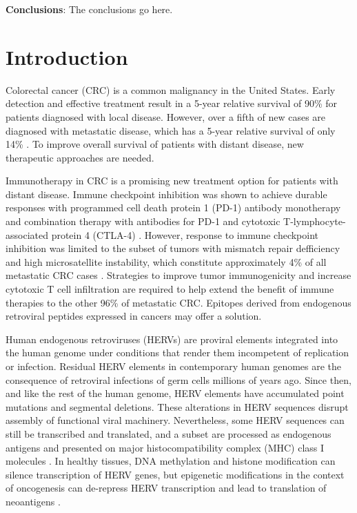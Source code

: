 \documentclass[10pt,letterpaper]{article}
\begin{document}
\textbf{Conclusions}: The conclusions go here.

\newpage
\section*{Introduction}
Colorectal cancer (CRC) is a common malignancy in the United States.
Early detection and effective treatment result in a 5-year relative survival of 90\% for patients diagnosed with local disease.
However, over a fifth of new cases are diagnosed with metastatic disease, which has a 5-year relative survival of only 14\% \cite{SEER2020}.
To improve overall survival of patients with distant disease, new therapeutic approaches are needed.

Immunotherapy in CRC is a promising new treatment option for patients with distant disease.
Immune checkpoint inhibition was shown to achieve durable responses with programmed cell death protein 1 (PD-1) antibody monotherapy and combination therapy with antibodies for PD-1 and cytotoxic T-lymphocyte-associated
protein 4 (CTLA-4) \cite{Le2015, Overman2018}.
However, response to immune checkpoint inhibition was limited to the subset of tumors with mismatch repair defficiency and high microsatellite instability, which constitute approximately 4\% of all metastatic CRC cases \cite{Ganesh2019}.
Strategies to improve tumor immunogenicity and increase cytotoxic T cell infiltration are required to help extend the benefit of immune therapies to the other 96\% of metastatic CRC.
Epitopes derived from endogenous retroviral peptides expressed in cancers may offer a solution.

Human endogenous retroviruses (HERVs) are proviral elements integrated into the human genome under conditions that render them incompetent of replication or infection.
Residual HERV elements in contemporary human genomes are the consequence of retroviral infections of germ cells millions of years ago.
Since then, and like the rest of the human genome, HERV elements have accumulated point mutations and segmental deletions.
These alterations in HERV sequences disrupt assembly of functional viral machinery.
Nevertheless, some HERV sequences can still be transcribed and translated, and a subset are processed as endogenous antigens and presented on major histocompatibility complex (MHC) class I molecules \cite{Boller1997, Rooney2015}.
In healthy tissues, DNA methylation and histone modification can silence transcription of HERV genes, but epigenetic modifications in the context of oncogenesis can de-repress HERV transcription and lead to translation of neoantigens \cite{Menendez2004, Wiesner2015}.
\end{document}
